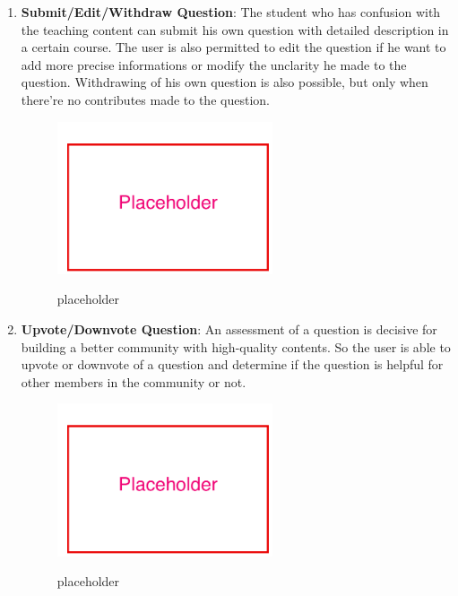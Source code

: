 \begin{enumerate}
\item
\textbf{Submit/Edit/Withdraw Question}: The student who has confusion with the teaching content can submit his own question with detailed description in a certain course. The user is also permitted to edit the question if he want to add more precise informations or modify the unclarity he made to the question. Withdrawing of his own question is also possible, but only when there're no contributes made to the question.

\begin{figure}[!htbp]
  \caption{placeholder}
  \centering
    \includegraphics[width=0.6\textwidth]{Figures/placeholder.png}
  \label{fig:placeholder}
\end{figure}

\item
\textbf{Upvote/Downvote Question}: An assessment of a question is decisive for building a better community with high-quality contents. So the user is able to upvote or downvote of a question and determine if the question is helpful for other members in the community or not.

\begin{figure}[!htbp]
  \caption{placeholder}
  \centering
    \includegraphics[width=0.6\textwidth]{Figures/placeholder.png}
  \label{fig:placeholder}
\end{figure}


\end{enumerate}
